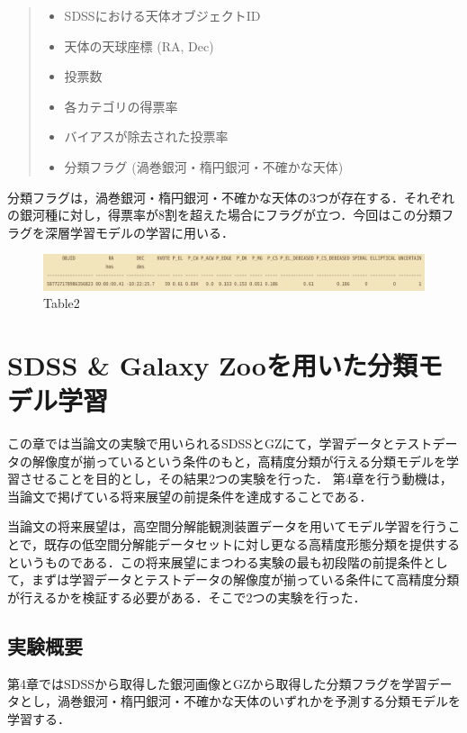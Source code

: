 \documentclass[a4j, 11pt]{jreport}
\begin{document}
\begin{quote}
 \begin{itemize}
	\item SDSSにおける天体オブジェクトID
	\item 天体の天球座標 (RA, Dec)
	\item 投票数
	\item 各カテゴリの得票率
	\item バイアスが除去された投票率
	\item 分類フラグ (渦巻銀河・楕円銀河・不確かな天体)
 \end{itemize}
\end{quote}

分類フラグは，渦巻銀河・楕円銀河・不確かな天体の3つが存在する．それぞれの銀河種に対し，得票率が8割を超えた場合にフラグが立つ．今回はこの分類フラグを深層学習モデルの学習に用いる．

\begin{figure}[h]
 \centering
 \includegraphics[width=18cm]{images/table2.png}
 \caption{Table2}
 \label{fig:table2}
\end{figure}

\newpage
\chapter{SDSS \& Galaxy Zooを用いた分類モデル学習}
この章では当論文の実験で用いられるSDSSとGZにて，学習データとテストデータの解像度が揃っているという条件のもと，高精度分類が行える分類モデルを学習させることを目的とし，その結果2つの実験を行った．
第4章を行う動機は，当論文で掲げている将来展望の前提条件を達成することである．

当論文の将来展望は，高空間分解能観測装置データを用いてモデル学習を行うことで，既存の低空間分解能データセットに対し更なる高精度形態分類を提供するというものである．この将来展望にまつわる実験の最も初段階の前提条件として，まずは学習データとテストデータの解像度が揃っている条件にて高精度分類が行えるかを検証する必要がある．そこで2つの実験を行った．

\section{実験概要}
第4章ではSDSSから取得した銀河画像とGZから取得した分類フラグを学習データとし，渦巻銀河・楕円銀河・不確かな天体のいずれかを予測する分類モデルを学習する．
\end{document}

